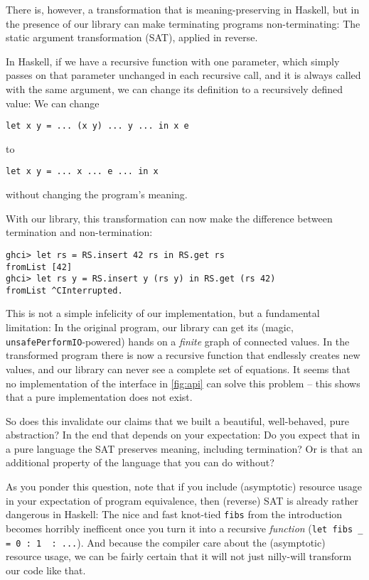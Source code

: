 \documentclass[manuscript,screen,acmsmall]{acmart}
\begin{document}
There is, however, a transformation that is meaning-preserving in Haskell, but in the presence of our library can make terminating programs non-terminating:
The static argument transformation (SAT), applied in reverse.

In Haskell, if we have a recursive function with one parameter, which simply passes on that parameter unchanged in each recursive call, and it is always called with the same argument, we can change its definition to a recursively defined value: We can change
\begin{verbatim}
let x y = ... (x y) ... y ... in x e
\end{verbatim}
to
\begin{verbatim}
let x y = ... x ... e ... in x
\end{verbatim}
without changing the program's meaning.

With our library, this transformation can now make the difference between termination and non-termination:
\begin{verbatim}
ghci> let rs = RS.insert 42 rs in RS.get rs
fromList [42]
ghci> let rs y = RS.insert y (rs y) in RS.get (rs 42)
fromList ^CInterrupted.
\end{verbatim}

This is not a simple infelicity of our implementation, but a fundamental limitation: In the original program, our library can get its (magic, \verb|unsafePerformIO|-powered) hands on a \emph{finite} graph of connected values. In the transformed program there is now a recursive function that endlessly creates new values, and our library can never see a complete set of equations. It seems that no implementation of the interface in \cref{fig:api} can solve this problem -- this shows that a pure implementation does not exist.

So does this invalidate our claims that we built a beautiful, well-behaved, pure abstraction? In the end that depends on your expectation: Do you expect that in a pure language the SAT preserves meaning, including termination? Or is that an additional property of the language that you can do without?

As you ponder this question, note that if you include (asymptotic) resource usage in your expectation of program equivalence, then (reverse) SAT is already rather dangerous in Haskell: The nice and fast knot-tied \verb|fibs| from the introduction becomes horribly inefficent once you turn it into a recursive \emph{function} (\verb|let fibs _ = 0 : 1  : ...|). And because the compiler care about the (asymptotic) resource usage, we can be fairly certain that it will not just nilly-will transform our code like that.
\end{document}

